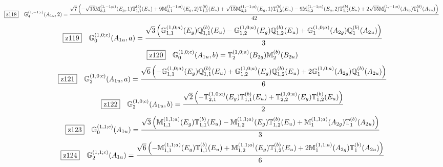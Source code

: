 \documentclass[fleqn,10pt,landscape]{jsarticle}
\begin{document}
\begin{dmath*}
\hspace*{3mm}\fbox{z118}\quad \mathbb{G}_{4}^{(1,-1;c)}(A_{1u},2)=\frac{\sqrt{7} \left(- \sqrt{15} \mathbb{M}_{3,1}^{(1,-1;a)}(E_{g},1) \mathbb{T}_{1,1}^{(b)}(E_{u}) + 9 \mathbb{M}_{3,1}^{(1,-1;a)}(E_{g},2) \mathbb{T}_{1,1}^{(b)}(E_{u}) + \sqrt{15} \mathbb{M}_{3,2}^{(1,-1;a)}(E_{g},1) \mathbb{T}_{1,2}^{(b)}(E_{u}) - 9 \mathbb{M}_{3,2}^{(1,-1;a)}(E_{g},2) \mathbb{T}_{1,2}^{(b)}(E_{u}) + 2 \sqrt{15} \mathbb{M}_{3}^{(1,-1;a)}(A_{2g}) \mathbb{T}_{1}^{(b)}(A_{2u})\right)}{42}
\end{dmath*}
\begin{dmath*}
\hspace*{3mm}\fbox{z119}\quad \mathbb{G}_{0}^{(1,0;c)}(A_{1u},a)=\frac{\sqrt{3} \left(\mathbb{G}_{1,1}^{(1,0;a)}(E_{g}) \mathbb{Q}_{1,1}^{(b)}(E_{u}) - \mathbb{G}_{1,2}^{(1,0;a)}(E_{g}) \mathbb{Q}_{1,2}^{(b)}(E_{u}) + \mathbb{G}_{1}^{(1,0;a)}(A_{2g}) \mathbb{Q}_{1}^{(b)}(A_{2u})\right)}{3}
\end{dmath*}
\begin{dmath*}
\hspace*{3mm}\fbox{z120}\quad \mathbb{G}_{0}^{(1,0;c)}(A_{1u},b)=\mathbb{T}_{2}^{(1,0;a)}(B_{2g}) \mathbb{M}_{2}^{(b)}(B_{2u})
\end{dmath*}
\begin{dmath*}
\hspace*{3mm}\fbox{z121}\quad \mathbb{G}_{2}^{(1,0;c)}(A_{1u},a)=\frac{\sqrt{6} \left(- \mathbb{G}_{1,1}^{(1,0;a)}(E_{g}) \mathbb{Q}_{1,1}^{(b)}(E_{u}) + \mathbb{G}_{1,2}^{(1,0;a)}(E_{g}) \mathbb{Q}_{1,2}^{(b)}(E_{u}) + 2 \mathbb{G}_{1}^{(1,0;a)}(A_{2g}) \mathbb{Q}_{1}^{(b)}(A_{2u})\right)}{6}
\end{dmath*}
\begin{dmath*}
\hspace*{3mm}\fbox{z122}\quad \mathbb{G}_{2}^{(1,0;c)}(A_{1u},b)=\frac{\sqrt{2} \left(- \mathbb{T}_{2,1}^{(1,0;a)}(E_{g}) \mathbb{T}_{1,1}^{(b)}(E_{u}) + \mathbb{T}_{2,2}^{(1,0;a)}(E_{g}) \mathbb{T}_{1,2}^{(b)}(E_{u})\right)}{2}
\end{dmath*}
\begin{dmath*}
\hspace*{3mm}\fbox{z123}\quad \mathbb{G}_{0}^{(1,1;c)}(A_{1u})=\frac{\sqrt{3} \left(\mathbb{M}_{1,1}^{(1,1;a)}(E_{g}) \mathbb{T}_{1,1}^{(b)}(E_{u}) - \mathbb{M}_{1,2}^{(1,1;a)}(E_{g}) \mathbb{T}_{1,2}^{(b)}(E_{u}) + \mathbb{M}_{1}^{(1,1;a)}(A_{2g}) \mathbb{T}_{1}^{(b)}(A_{2u})\right)}{3}
\end{dmath*}
\begin{dmath*}
\hspace*{3mm}\fbox{z124}\quad \mathbb{G}_{2}^{(1,1;c)}(A_{1u})=\frac{\sqrt{6} \left(- \mathbb{M}_{1,1}^{(1,1;a)}(E_{g}) \mathbb{T}_{1,1}^{(b)}(E_{u}) + \mathbb{M}_{1,2}^{(1,1;a)}(E_{g}) \mathbb{T}_{1,2}^{(b)}(E_{u}) + 2 \mathbb{M}_{1}^{(1,1;a)}(A_{2g}) \mathbb{T}_{1}^{(b)}(A_{2u})\right)}{6}
\end{dmath*}
\end{document}
